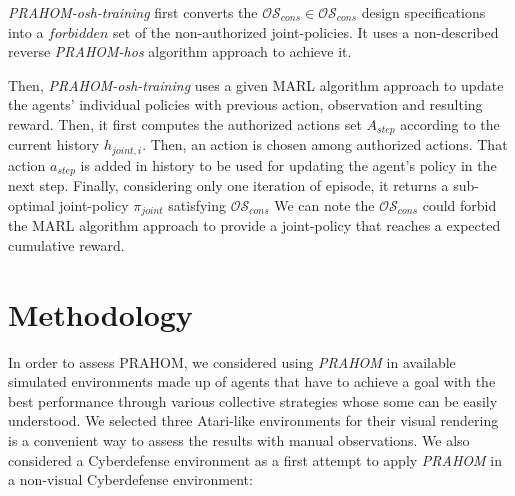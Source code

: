 \documentclass{ecai}
\begin{document}
\emph{PRAHOM-osh-training} first converts the $\mathcal{OS}_{cons} \in \mathcal{OS}_{cons}$ design specifications into a $forbidden$ set of the non-authorized joint-policies. It uses a non-described reverse \emph{PRAHOM-hos} algorithm approach to achieve it.

Then, \emph{PRAHOM-osh-training} uses a given MARL algorithm approach to update the agents' individual policies with previous action, observation and resulting reward. Then, it first computes the authorized actions set $A_{step}$ according to the current history $h_{joint,i}$. Then, an action is chosen among authorized actions. That action $a_{step}$ is added in history to be used for updating the agent's policy in the next step.
Finally, considering only one iteration of episode, it returns a sub-optimal joint-policy $\pi_{joint}$ satisfying $\mathcal{OS}_{cons}$
We can note the $\mathcal{OS}_{cons}$ could forbid the MARL algorithm approach to provide a joint-policy that reaches a expected cumulative reward.


\section{Methodology}


In order to assess PRAHOM, we considered using \emph{PRAHOM} in available simulated environments made up of agents that have to achieve a goal with the best performance through various collective strategies whose some can be easily understood.
We selected three Atari-like environments for their visual rendering is a convenient way to assess the results with manual observations\footnotemark[1].
We also considered a Cyberdefense environment as a first attempt to apply \emph{PRAHOM} in a non-visual Cyberdefense environment:

\end{document}
